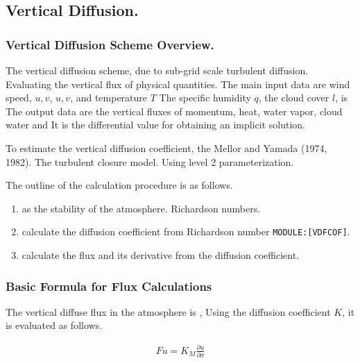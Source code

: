 \hypertarget{vertical-diffusion.}{%
\subsection{Vertical Diffusion.}\label{vertical-diffusion.}}

\hypertarget{vertical-diffusion-scheme-overview.}{%
\subsubsection{Vertical Diffusion Scheme
Overview.}\label{vertical-diffusion-scheme-overview.}}

The vertical diffusion scheme, due to sub-grid scale turbulent
diffusion. Evaluating the vertical flux of physical quantities. The main
input data are wind speed, \(u, v\), \(u, v\), and temperature \(T\) The
specific humidity \(q\), the cloud cover \(l\), is The output data are
the vertical fluxes of momentum, heat, water vapor, cloud water and It
is the differential value for obtaining an implicit solution.

To estimate the vertical diffusion coefficient, the Mellor and Yamada
(1974, 1982). The turbulent closure model. Using level 2
parameterization.

The outline of the calculation procedure is as follows.

\begin{enumerate}
\def\labelenumi{\arabic{enumi}.}
\item
  as the stability of the atmosphere. Richardson numbers.
\item
  calculate the diffusion coefficient from Richardson number
  \texttt{MODULE:{[}VDFCOF{]}}.
\item
  calculate the flux and its derivative from the diffusion coefficient.
\end{enumerate}

\hypertarget{basic-formula-for-flux-calculations}{%
\subsubsection{Basic Formula for Flux
Calculations}\label{basic-formula-for-flux-calculations}}

The vertical diffuse flux in the atmosphere is , Using the diffusion
coefficient \(K\), it is evaluated as follows.

\begin{eqnarray}
  F{u} = K_{M} \frac{\partial u}{\partial \sigma} 
\end{eqnarray}

